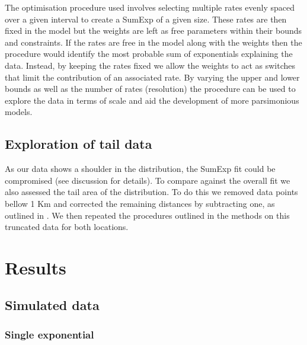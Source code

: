 \documentclass[11pt,usenames,dvipsnames,a4paper]{article}
\begin{document}
\begin{linenumbers}
The optimisation procedure used involves selecting multiple rates evenly spaced over a given interval to create a SumExp of a given size. These rates are then fixed in the model but the weights are left as free parameters within their bounds and constraints. If the rates are free in the model along with the weights then the procedure would identify the most probable sum of exponentials explaining the data. Instead, by keeping the rates fixed we allow the weights to act as switches that limit the contribution of an associated rate. By varying the upper and lower bounds as well as the number of rates (resolution) the procedure can be used to explore the data in terms of scale and aid the development of more parsimonious models. 
\end{linenumbers}

\subsection{Exploration of tail data}

\begin{linenumbers}
\hspace{\parindent}
As our data shows a shoulder in the distribution, the SumExp fit could be compromised (see discussion for details). To compare against the overall fit we also assessed the tail area of the distribution. To do this we removed data points bellow 1 Km and corrected the remaining distances by subtracting one, as outlined in \cite{Petrovskii2011}. We then repeated the procedures outlined in the methods on this truncated data for both locations.
\end{linenumbers}
\section{Results}

\noindent
\subsection{Simulated data}

\subsubsection{Single exponential}
\end{document}

